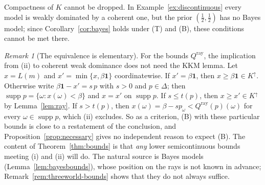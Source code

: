 \documentclass[11pt]{article}
\theoremstyle{definition}
\theoremstyle{remark}
\newtheorem{remark}[theorem]{Remark}
\newcommand{\one}{\mathbf 1}
\newcommand{\supp}{\operatorname{supp}}
\begin{document}
Compactness of $K$ cannot be dropped. In Example~\ref{ex:discontinuous} every model is weakly dominated by a coherent one, but the prior $(\tfrac12,\tfrac12)$ has no Bayes model; since Corollary~\ref{cor:bayes} holds under (T) and (B), these conditions cannot be met there.

\begin{remark}[The equivalence is elementary]\label{rem:elementary}
For the bounds $Q^{\mathrm{ray}}$, the implication from (ii) to coherent weak dominance does not need the KKM lemma. Let $x=L(m)$ and $x'=\min\{x,\beta\one\}$ coordinatewise. If $x'=\beta\one$, then $x\ge \beta\one\in K^\uparrow$. Otherwise write $\beta\one-x'=s\,p$ with $s>0$ and $p\in\Delta$; then $\supp p=\{\omega:x(\omega)<\beta\}$ and $x=x'$ on $\supp p$. If $s\le t(p)$, then $x\ge x'\in K^\uparrow$ by Lemma~\ref{lem:ray}. If $s>t(p)$, then $x(\omega)=\beta-sp_\omega<Q^{\mathrm{ray}}(p)(\omega)$ for every $\omega\in\supp p$, which (ii) excludes. So as a criterion, (B) with these particular bounds is close to a restatement of the conclusion, and Proposition~\ref{prop:necessary} gives no independent reason to expect (B). The content of Theorem~\ref{thm:bounds} is that \emph{any} lower semicontinuous bounds meeting (i) and (ii) will do. The natural source is Bayes models (Lemma~\ref{lem:bayesbounds}), whose position on the rays is not known in advance; Remark~\ref{rem:threeworld-bounds} shows that they do not always suffice.
\end{remark}
\end{document}
